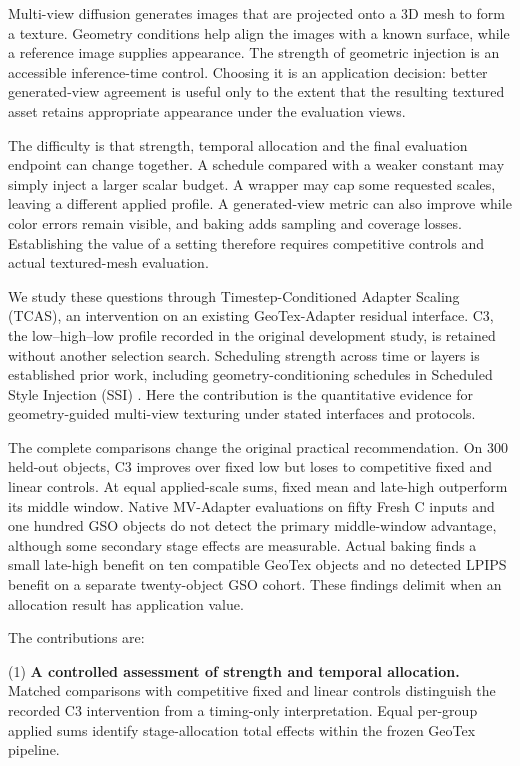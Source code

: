 \documentclass[times,twocolumn,final]{elsarticle}
\begin{document}
Multi-view diffusion generates images that are projected onto a 3D mesh to form a texture. Geometry conditions help align the images with a known surface, while a reference image supplies appearance. The strength of geometric injection is an accessible inference-time control. Choosing it is an application decision: better generated-view agreement is useful only to the extent that the resulting textured asset retains appropriate appearance under the evaluation views.

The difficulty is that strength, temporal allocation and the final evaluation endpoint can change together. A schedule compared with a weaker constant may simply inject a larger scalar budget. A wrapper may cap some requested scales, leaving a different applied profile. A generated-view metric can also improve while color errors remain visible, and baking adds sampling and coverage losses. Establishing the value of a setting therefore requires competitive controls and actual textured-mesh evaluation.

We study these questions through Timestep-Conditioned Adapter Scaling (TCAS), an intervention on an existing GeoTex-Adapter residual interface. C3, the low--high--low profile recorded in the original development study, is retained without another selection search. Scheduling strength across time or layers is established prior work, including geometry-conditioning schedules in Scheduled Style Injection (SSI) \cite{kulkarni2026ssi}. Here the contribution is the quantitative evidence for geometry-guided multi-view texturing under stated interfaces and protocols.

The complete comparisons change the original practical recommendation. On 300 held-out objects, C3 improves over fixed low but loses to competitive fixed and linear controls. At equal applied-scale sums, fixed mean and late-high outperform its middle window. Native MV-Adapter evaluations on fifty Fresh C inputs and one hundred GSO objects do not detect the primary middle-window advantage, although some secondary stage effects are measurable. Actual baking finds a small late-high benefit on ten compatible GeoTex objects and no detected LPIPS benefit on a separate twenty-object GSO cohort. These findings delimit when an allocation result has application value.

The contributions are:

(1) \textbf{A controlled assessment of strength and temporal allocation.} Matched comparisons with competitive fixed and linear controls distinguish the recorded C3 intervention from a timing-only interpretation. Equal per-group applied sums identify stage-allocation total effects within the frozen GeoTex pipeline.
\end{document}
